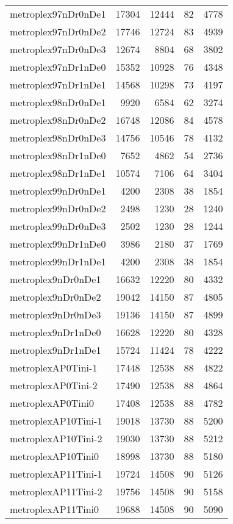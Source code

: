 \begin{tabular}{lrrrr}
metroplex97nDr0nDe1 & 17304 & 12444 & 82 & 4778 \\
metroplex97nDr0nDe2 & 17746 & 12724 & 83 & 4939 \\
metroplex97nDr0nDe3 & 12674 & 8804 & 68 & 3802 \\
metroplex97nDr1nDe0 & 15352 & 10928 & 76 & 4348 \\
metroplex97nDr1nDe1 & 14568 & 10298 & 73 & 4197 \\
metroplex98nDr0nDe1 & 9920 & 6584 & 62 & 3274 \\
metroplex98nDr0nDe2 & 16748 & 12086 & 84 & 4578 \\
metroplex98nDr0nDe3 & 14756 & 10546 & 78 & 4132 \\
metroplex98nDr1nDe0 & 7652 & 4862 & 54 & 2736 \\
metroplex98nDr1nDe1 & 10574 & 7106 & 64 & 3404 \\
metroplex99nDr0nDe1 & 4200 & 2308 & 38 & 1854 \\
metroplex99nDr0nDe2 & 2498 & 1230 & 28 & 1240 \\
metroplex99nDr0nDe3 & 2502 & 1230 & 28 & 1244 \\
metroplex99nDr1nDe0 & 3986 & 2180 & 37 & 1769 \\
metroplex99nDr1nDe1 & 4200 & 2308 & 38 & 1854 \\
metroplex9nDr0nDe1 & 16632 & 12220 & 80 & 4332 \\
metroplex9nDr0nDe2 & 19042 & 14150 & 87 & 4805 \\
metroplex9nDr0nDe3 & 19136 & 14150 & 87 & 4899 \\
metroplex9nDr1nDe0 & 16628 & 12220 & 80 & 4328 \\
metroplex9nDr1nDe1 & 15724 & 11424 & 78 & 4222 \\
metroplexAP0Tini-1 & 17448 & 12538 & 88 & 4822 \\
metroplexAP0Tini-2 & 17490 & 12538 & 88 & 4864 \\
metroplexAP0Tini0 & 17408 & 12538 & 88 & 4782 \\
metroplexAP10Tini-1 & 19018 & 13730 & 88 & 5200 \\
metroplexAP10Tini-2 & 19030 & 13730 & 88 & 5212 \\
metroplexAP10Tini0 & 18998 & 13730 & 88 & 5180 \\
metroplexAP11Tini-1 & 19724 & 14508 & 90 & 5126 \\
metroplexAP11Tini-2 & 19756 & 14508 & 90 & 5158 \\
metroplexAP11Tini0 & 19688 & 14508 & 90 & 5090 \\

\end{tabular}
